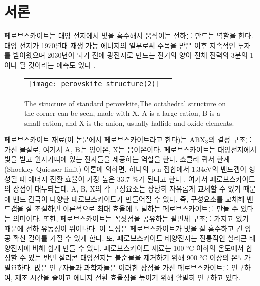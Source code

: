 
\section{서론}

페로브스카이트는 태양 전지에서 빛을 흡수해서 움직이는 전하를 만드는 역할을 한다. 태양 전지가 1970년대 재생 가능 에너지의 일부로써 주목을 받은 이후 지속적인 투자를 받아왔으며 2030년이 되기 전에 광전지로 만드는 전기의 양이 전체 전력의 3분의 1이나 될 것이라는 예측도 있다 \cite{turner2013global}.

\begin{figure}[h!]
	\begin{center}
		\begin{tabular}{cc}
			\texttt{[image: perovskite\_structure(2)]} 
		\end{tabular}
		\caption{The structure of standard perovskite,The octahedral structure on the corner can be seen, made with X. A is a large cation, B is a small cation, and X is the anion, usually hallide and oxide elements.}	
		\label{fig:FIR101}
	\end{center}
\end{figure}

페로브스카이트 재료(이 논문에서 페로브스카이트라고 한다)는 $\rm{ABX_3}$의 결정 구조를 가진 물질로, 여기서 $\rm{A}$, $\rm{B}$는 양이온, X는 음이온이다. 페로브스카이트는 태양전지에서 빛을 받고 원자가띠에 있는 전자들을 제공하는 역할을 한다. 쇼클리-퀴서 한계(Shockley-Quiesser limit) 이론에 의하면, 하나의 p-n 접합에서 1.34eV의 밴드갭이 형성될 때 에너지 전환 효율이 가장 높은 33.7 \%가 된다고 한다 \cite{ruhle2016tabulated}. 여기서 페로브스카이트의 장점이 대두되는데, A, B, X의 각 구성요소는 상당히 자유롭게 교체할 수 있기 때문에 밴드 간극이  다양한 페로브스카이트가 만들어질 수 있다. 즉, 구성요소를 교체해 밴드갭을 잘 조절하면 이론적으로 최대 효율에 도달하는 페로브스카이트를 만들 수 있다는 의미이다. 또한, 페로브스카이트는 꼭짓점을 공유하는 팔면체 구조를 가지고 있기 때문에 전하 유동성이 뛰어나다\cite{linaburg2015studies}. 이 특성은 페로브스카이트가 빛을 잘 흡수하고 긴 양공 확산 길이를 가질 수 있게 한다\cite{green2014emergence}. 또, 페로브스카이트 태양전지는 전통적인 실리콘 태양전지에 비해 쉽게 만들 수 있다. 페로브스카이트 재료는 100 °C 이하의 온도에서 합성할 수 있는 반면 실리콘 태양전지는 불순물을 제거하기 위해 900 °C 이상의 온도가 필요하다.
많은 연구자들과 과학자들은 이러한 장점을 가진 페로브스카이트를 연구하여, 제조 시간을 줄이고 에너지 전환 효율성을 높이기 위해 활발히 연구하고 있다.

